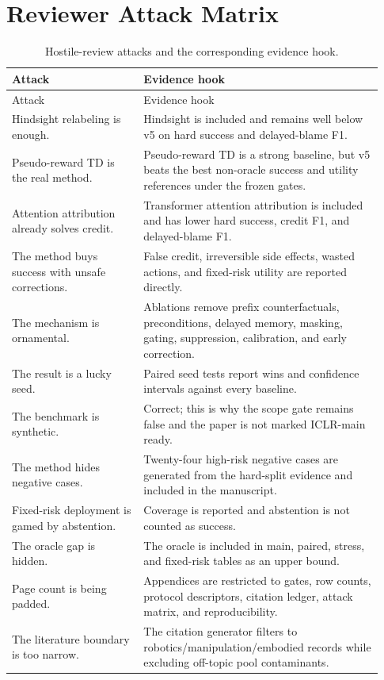 \documentclass{article}
\begin{document}
\section{Reviewer Attack Matrix}
\begin{longtable}{@{}p{0.33\linewidth}p{0.60\linewidth}@{}}
\caption{Hostile-review attacks and the corresponding evidence hook.}\\
\toprule
Attack & Evidence hook\\
\midrule
\endfirsthead
\toprule
Attack & Evidence hook\\
\midrule
\endhead
Hindsight relabeling is enough. & Hindsight is included and remains well below v5 on hard success and delayed-blame F1. \\
Pseudo-reward TD is the real method. & Pseudo-reward TD is a strong baseline, but v5 beats the best non-oracle success and utility references under the frozen gates. \\
Attention attribution already solves credit. & Transformer attention attribution is included and has lower hard success, credit F1, and delayed-blame F1. \\
The method buys success with unsafe corrections. & False credit, irreversible side effects, wasted actions, and fixed-risk utility are reported directly. \\
The mechanism is ornamental. & Ablations remove prefix counterfactuals, preconditions, delayed memory, masking, gating, suppression, calibration, and early correction. \\
The result is a lucky seed. & Paired seed tests report wins and confidence intervals against every baseline. \\
The benchmark is synthetic. & Correct; this is why the scope gate remains false and the paper is not marked ICLR-main ready. \\
The method hides negative cases. & Twenty-four high-risk negative cases are generated from the hard-split evidence and included in the manuscript. \\
Fixed-risk deployment is gamed by abstention. & Coverage is reported and abstention is not counted as success. \\
The oracle gap is hidden. & The oracle is included in main, paired, stress, and fixed-risk tables as an upper bound. \\
Page count is being padded. & Appendices are restricted to gates, row counts, protocol descriptors, citation ledger, attack matrix, and reproducibility. \\
The literature boundary is too narrow. & The citation generator filters to robotics/manipulation/embodied records while excluding off-topic pool contaminants. \\
\bottomrule
\end{longtable}
\end{document}
